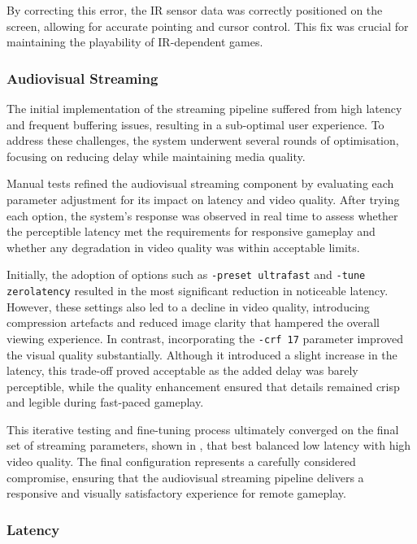 By correcting this error, the IR sensor data was correctly positioned on the screen, allowing for accurate pointing and cursor control. This fix was crucial for maintaining the playability of IR-dependent games.

\subsubsection{Audiovisual Streaming}
The initial implementation of the streaming pipeline suffered from high latency and frequent buffering issues, resulting in a sub-optimal user experience. To address these challenges, the system underwent several rounds of optimisation, focusing on reducing delay while maintaining media quality.

Manual tests refined the audiovisual streaming component by evaluating each parameter adjustment for its impact on latency and video quality. After trying each option, the system’s response was observed in real time to assess whether the perceptible latency met the requirements for responsive gameplay and whether any degradation in video quality was within acceptable limits.

Initially, the adoption of options such as \texttt{-preset ultrafast} and \linebreak \texttt{-tune zerolatency} resulted in the most significant reduction in noticeable latency. However, these settings also led to a decline in video quality, introducing compression artefacts and reduced image clarity that hampered the overall viewing experience. In contrast, incorporating the \texttt{-crf 17} parameter improved the visual quality substantially. Although it introduced a slight increase in the latency, this trade-off proved acceptable as the added delay was barely perceptible, while the quality enhancement ensured that details remained crisp and legible during fast-paced gameplay.

This iterative testing and fine-tuning process ultimately converged on the final set of streaming parameters, shown in , that best balanced low latency with high video quality. The final configuration represents a carefully considered compromise, ensuring that the audiovisual streaming pipeline delivers a responsive and visually satisfactory experience for remote gameplay.


\subsubsection{Latency}

